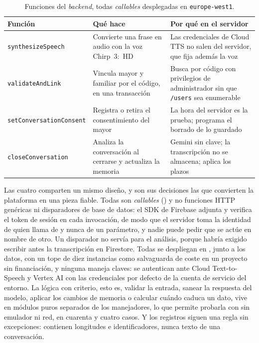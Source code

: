 \begin{table}[htbp]
    \centering
    \small
    \begin{tabularx}{\textwidth}{@{}l >{\RaggedRight\arraybackslash}X >{\RaggedRight\arraybackslash}X@{}}
        \toprule
        \textbf{Función} & \textbf{Qué hace} & \textbf{Por qué en el servidor} \\
        \midrule
        \texttt{synthesizeSpeech}       & Convierte una frase en audio con la voz Chirp~3:~HD
            & Las credenciales de Cloud TTS no salen del servidor, que fija además la voz \\
        \addlinespace
        \texttt{validateAndLink}        & Vincula mayor y familiar por el código, en una transacción
            & Busca por código con privilegios de administrador sin que \texttt{/users} sea enumerable \\
        \addlinespace
        \texttt{setConversationConsent} & Registra o retira el consentimiento del mayor
            & La hora del servidor es la prueba; programa el borrado de lo guardado \\
        \addlinespace
        \texttt{closeConversation}      & Analiza la conversación al cerrarse y actualiza la
            memoria & Gemini sin clave; la transcripción no se almacena; aplica los plazos \\
        \bottomrule
    \end{tabularx}
    \caption{Funciones del \emph{backend}, todas \emph{callables} desplegadas en \texttt{europe-west1}.}
    \label{tab:callables}
\end{table}

Las cuatro comparten un mismo diseño, y son sus decisiones las que convierten la plataforma en una pieza
fiable. Todas son \emph{callables} () y no funciones HTTP genéricas ni disparadores de base de
datos: el SDK de Firebase adjunta y verifica el token de sesión en cada invocación, de modo que el servidor
toma la identidad de quien llama de  y nunca de un parámetro, y nadie puede pedir que se
actúe en nombre de otro. Un disparador no servía para el análisis, porque habría exigido escribir antes la
transcripción en Firestore. Todas se despliegan en , junto a los datos, con un tope de
diez instancias como salvaguarda de coste en un proyecto sin financiación, y ninguna maneja claves: se
autentican ante Cloud Text-to-Speech y Vertex AI con las credenciales por defecto de la cuenta de servicio
del entorno. La lógica con criterio, esto es, validar la entrada, sanear la respuesta del modelo, aplicar los
cambios de memoria o calcular cuándo caduca un dato, vive en módulos puros separados de los manejadores, lo
que permite probarla con  sin emulador ni red, en cuarenta y cuatro casos. Y los registros
siguen una regla sin excepciones: contienen longitudes e identificadores, nunca texto de una conversación.

